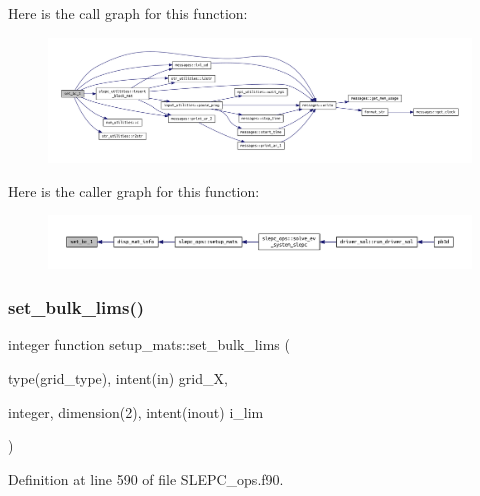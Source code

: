 Here is the call graph for this function\+:
\nopagebreak
\begin{figure}[H]
\begin{center}
\leavevmode
\includegraphics[width=350pt]{SLEPC__ops_8f90_abdaf8a38000d4b3d52de078affcd853d_cgraph}
\end{center}
\end{figure}
Here is the caller graph for this function\+:
\nopagebreak
\begin{figure}[H]
\begin{center}
\leavevmode
\includegraphics[width=350pt]{SLEPC__ops_8f90_abdaf8a38000d4b3d52de078affcd853d_icgraph}
\end{center}
\end{figure}
\mbox{\label{SLEPC__ops_8f90_aad0c37f65f398c2aa88ea11b21eb2006}} 
\subsubsection{\texorpdfstring{set\+\_\+bulk\+\_\+lims()}{set\_bulk\_lims()}}
{\footnotesize\ttfamily integer function setup\+\_\+mats\+::set\+\_\+bulk\+\_\+lims (\begin{DoxyParamCaption}\item[{type(grid\+\_\+type), intent(in)}]{grid\+\_\+X,  }\item[{integer, dimension(2), intent(inout)}]{i\+\_\+lim }\end{DoxyParamCaption})}



Definition at line 590 of file S\+L\+E\+P\+C\+\_\+ops.\+f90.

